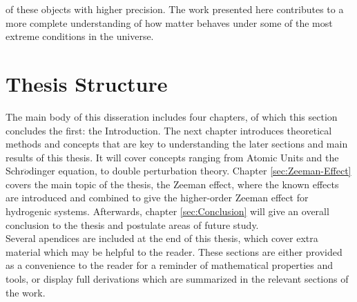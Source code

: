 of these objects with higher precision. The work presented here contributes to a more complete understanding of how matter behaves under some of the most extreme conditions in the universe.
    \section{Thesis Structure}
        The main body of this disseration includes four chapters, of which this section concludes the first: the Introduction. The next chapter introduces theoretical methods and concepts that are key to understanding the later sections and main results of this thesis. It will cover concepts ranging from Atomic Units and the Schr$\ddot{o}$dinger equation, to double perturbation theory. Chapter \ref{sec:Zeeman-Effect} covers the main topic of the thesis, the Zeeman effect, where the known effects are introduced and combined to give the higher-order Zeeman effect for hydrogenic systems. Afterwards, chapter \ref{sec:Conclusion} will give an overall conclusion to the thesis and postulate areas of future study.\\

        Several apendices are included at the end of this thesis, which cover extra material which may be helpful to the reader. These sections are either provided as a convenience to the reader for a reminder of mathematical properties and tools, or display full derivations which are summarized in the relevant sections of the work.
